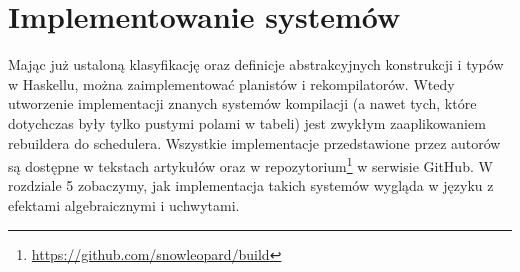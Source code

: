 \section{Implementowanie systemów}

Mając już ustaloną klasyfikację oraz definicje abstrakcyjnych konstrukcji i typów w Haskellu, można zaimplementować planistów i rekompilatorów. Wtedy utworzenie implementacji znanych systemów kompilacji (a nawet tych, które dotychczas były tylko pustymi polami w tabeli) jest zwykłym zaaplikowaniem rebuildera do schedulera. Wszystkie implementacje przedstawione przez autorów \BSaLC{} są dostępne w tekstach artykułów \cite{mokhov2018build, mokhov2020build} oraz w repozytorium\footnote{\url{https://github.com/snowleopard/build}} w serwisie GitHub. W rozdziale 5 zobaczymy, jak implementacja takich systemów wygląda w języku z efektami algebraicznymi i uchwytami.
